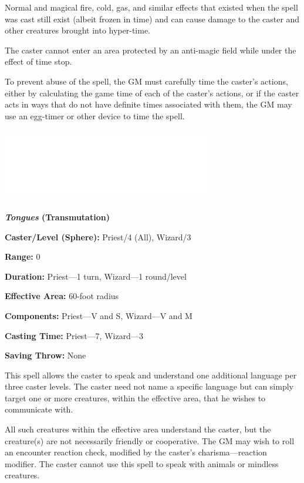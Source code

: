 \begin{multicols}{2}
Normal and magical fire, cold, gas, and similar effects that existed when the spell was cast still exist (albeit frozen in time) and can cause damage to the caster and other creatures brought into hyper-time.

The caster cannot enter an area protected by an anti-magic field while under the effect of time stop.

To prevent abuse of the spell, the GM must carefully time the caster's actions, either by calculating the game time of each of the caster's actions, or if the caster acts in ways that do not have definite times associated with them, the GM may use an egg-timer or other device to time the spell.

\noindent\includegraphics[width=3.6in, height=1.25in]{testblock.pdf}
 
\vspace{1em}

\noindent
\begin{minipage}{\columnwidth}

\noindent \textbf{\textit{Tongues} (Transmutation)}

\noindent \textbf{Caster/Level (Sphere):} Priest/4 (All), Wizard/3

\noindent \textbf{Range:} 0

\noindent \textbf{Duration:} Priest---1 turn, Wizard---1 round/level

\noindent \textbf{Effective Area:} 60-foot radius

\noindent \textbf{Components:} Priest---V and S, Wizard---V and M

\noindent \textbf{Casting Time:} Priest---7, Wizard---3

\noindent \textbf{Saving Throw:} None

\end{minipage}

This spell allows the caster to speak and understand one additional language per three caster levels.  The caster need not name a specific language but can simply target one or more creatures, within the effective area, that he wishes to communicate with.  

All such creatures within the effective area understand the caster, but the creature(s) are not necessarily friendly or cooperative.  The GM may wish to roll an encounter reaction check, modified by the caster's charisma---reaction modifier.  The caster cannot use this spell to speak with animals or mindless creatures.  


\end{multicols}
